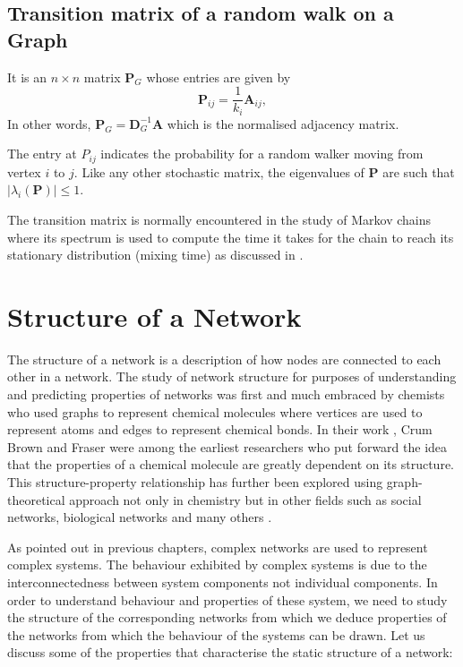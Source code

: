 \documentclass[10pt,a4paper]{article}
\begin{document}
\subsection{Transition matrix of a random walk on a Graph}
It is an $n \times n$ matrix $\mathbf{P}_G$ whose entries are given by
\begin{equation}
\mathbf{P}_{ij} = \frac{1}{k_i} \mathbf{A}_{ij},
\end{equation}
In other words, $\mathbf{P}_G = \mathbf{D}_{G} ^ {-1} \mathbf{A}$ which is the normalised adjacency matrix.

The entry at $P_{ij}$ indicates the probability for a random walker moving from vertex $i$ to $j$. Like any other stochastic matrix, the eigenvalues of $\mathbf{P}$ are such that $|\lambda_i(\mathbf{P})| \leq 1$.

The transition matrix is normally encountered in the study of Markov chains where its spectrum is used to compute the time it takes for the chain to reach its stationary distribution (mixing time) as discussed in \citep{behrends2000introduction}.



\section{Structure of a Network}

The structure of a network is a description of how nodes are connected to each other in a network. 
The study of network structure for purposes of understanding and predicting properties of networks was first and much embraced by chemists who used graphs to represent chemical molecules where vertices are used to represent atoms and edges to represent chemical
bonds.  In their work \citep{brown1868connection}, Crum Brown and Fraser were among the earliest researchers who put forward the idea that the properties of a chemical molecule are greatly dependent on its structure.  This structure-property relationship has further been explored using graph-theoretical approach not only in chemistry but in other fields such as social networks, biological networks and many others \citep{mihalic1992graph,smith2004associations,wellman1988social,wey2008social}.  

As pointed out in previous chapters, complex networks are used to represent complex systems. The behaviour exhibited by complex systems is due to the interconnectedness between system components not individual components. In order to understand behaviour and properties of these system, we need to study the structure of the corresponding networks from which we deduce properties of the networks from which the behaviour of the systems can be drawn. Let us discuss some of the properties that characterise the static structure of a network:
\end{document}
